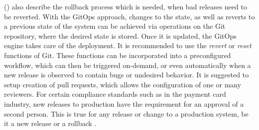 \citeauthor{gitopsAndKubernetes2021continuous} (\citeyear{gitopsAndKubernetes2021continuous})
also describe the rollback process which is needed,
when bad releases need to be reverted.
With the GitOps approach, changes to the state, as well as reverts to a previous state
of the system can be achieved via operations on the Git repository,
where the desired state is stored. Once it is updated, the GitOps engine takes care of the deployment.
It is recommended to use the \textit{revert} or \textit{reset} functions of Git.
These functions can be incorporated into a preconfigured workflow,
which can then be triggered on-demand,
or even automatically when a new release is observed to contain bugs or undesired behavior.
It is suggested to setup creation of pull requests,
which allows the configuration of one or many reviewers.
For certain compliance standards such as in the payment card industry,
new releases to production have the requirement for an approval of a second person.
This is true for any release or change to a production system,
be it a new release or a rollback
\autocite{gitopsAndKubernetes2021continuous}.























